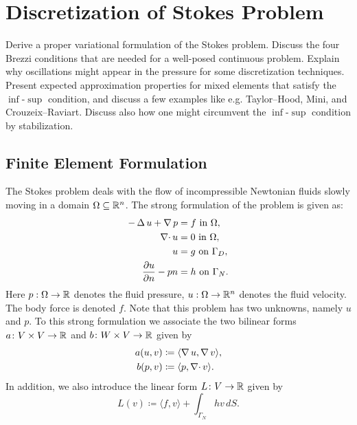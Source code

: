 \chapter[Stokes Problem]{Discretization of Stokes Problem}

\begin{problem_text}
Derive a proper variational formulation of the Stokes problem. Discuss the four
Brezzi conditions that are needed for a well-posed continuous problem. Explain
why oscillations might appear in the pressure for some discretization
techniques. Present expected approximation properties for mixed elements that
satisfy the \(\inf\)-\(\sup\) condition, and discuss a few examples like e.g.
Taylor--Hood, Mini, and Crouzeix--Raviart. Discuss also how one might circumvent
the \(\inf\)-\(\sup\) condition by stabilization. 
\end{problem_text}



\section{Finite Element Formulation}

The Stokes problem deals with the flow of incompressible Newtonian fluids
slowly moving in a domain \( \Omega \subseteq \mathbb{R}^n\). The strong formulation of
the problem is given as:
\begin{align}
    -\operatorname{\mathop{}\!\Delta} u + \operatorname{\mathop{}\!\nabla} p &= f \text{ in }  \Omega, \\
    \operatorname{\mathop{}\!\nabla \cdot} u &= 0 \text{ in } \Omega,  \\
    u &= g \text{ on } \Gamma_D, \\
    \frac{\partial u}{\partial n} - pn &= h \text{ on } \Gamma_N.
\end{align}
Here \( p : \Omega \to \mathbb{R} \) denotes the fluid pressure, \( u : \Omega \to \mathbb{R}^n
\) denotes the fluid velocity. The body force is denoted \( f \). Note that
this problem has two unknowns, namely \( u \) and \( p \). To this strong
formulation we associate the two bilinear forms \( a \colon V \times
V \to \mathbb{R} \) and \( b \colon W \times V \to \mathbb{R} \) given by
\begin{align}
    a(u, v) &\coloneqq \langle \operatorname{\mathop{}\!\nabla} u, \operatorname{\mathop{}\!\nabla} v \rangle, \\
    b(p, v) &\coloneqq \langle p, \operatorname{\mathop{}\!\nabla \cdot} v \rangle.
\end{align}
In addition, we also introduce the linear form \( L \colon V \to \mathbb{R} \)
given by
\begin{equation}
    L(v) \coloneqq \langle f, v \rangle + \int_{\Gamma_N} h v \, dS.
\end{equation}

